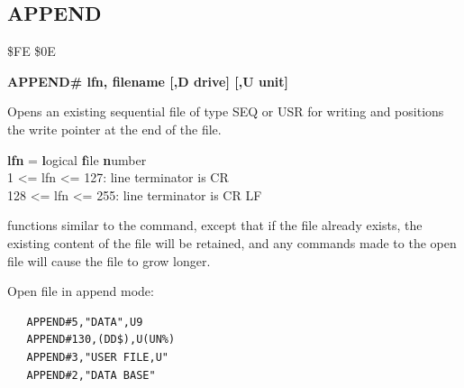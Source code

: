 \subsection{APPEND}
\begin{description}[leftmargin=2cm,style=nextline]
\item [Token:] \$FE \$0E
\item [Format:]
  {\bf APPEND\# lfn, filename [,D drive] [,U unit] }
\item [Usage:]
   Opens an existing sequential file of type
   SEQ or USR for writing and positions the write pointer
   at the end of the file.

   {\bf lfn} = {\bf l}ogical {\bf f}ile {\bf n}umber \\
   1 <= lfn <= 127: line terminator is CR \\
   128 <= lfn <= 255: line terminator is CR LF

   \filenamedefinition

   \drivedefinition

   \unitdefinition

\item [Remarks:]
    functions similar to the 
   command, except that if the file already
   exists, the existing content of the file will be retained, and any
    commands made to the
   open file will cause the file to grow longer.

\item [Example:] Open file in append mode:

\begin{tcolorbox}[colback=black,coltext=white]
\verbatimfont{\codefont}
\begin{verbatim}
   APPEND#5,"DATA",U9
   APPEND#130,(DD$),U(UN%)
   APPEND#3,"USER FILE,U"
   APPEND#2,"DATA BASE"
\end{verbatim}
\end{tcolorbox}
\end{description}


\newpage
